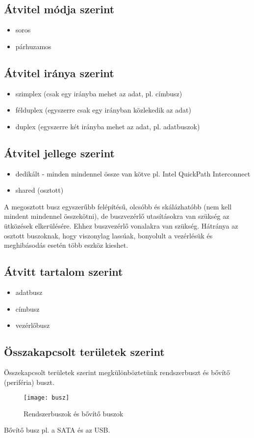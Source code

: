 \subsection{Átvitel módja szerint}
\begin{itemize}
    \item soros
    \item párhuzamos
\end{itemize}

\subsection{Átvitel iránya szerint}
\begin{itemize}
    \item szimplex (csak egy irányba mehet az adat, pl. címbusz)
    \item félduplex (egyszerre csak egy irányban közlekedik az adat)
    \item duplex (egyszerre két irányba mehet az adat, pl. adatbuszok)
\end{itemize}

\subsection{Átvitel jellege szerint}
\begin{itemize}
    \item dedikált - minden mindennel össze van kötve pl. Intel QuickPath Interconnect
    \item shared (osztott)
\end{itemize}
A megosztott busz egyszerűbb felépítésű, olcsóbb és skálázhatóbb (nem kell mindent mindennel összekötni), de buszvezérlő utasításokra van szükség az ütközések elkerülésére.
Ehhez buszvezérlő vonalakra van szükség.
Hátránya az osztott buszoknak, hogy viszonylag lassúak, bonyolult a vezérlésük és meghibásodás esetén több eszköz kieshet.

\subsection{Átvitt tartalom szerint}
\begin{itemize}
    \item adatbusz
    \item címbusz
    \item vezérlőbusz
\end{itemize}

\subsection{Összakapcsolt területek szerint}
Összekapcsolt területek szerint megkülönböztetünk rendszerbuszt és bővítő (periféria) buszt.
\begin{figure}[H]
    \texttt{[image: busz]}
    \centering
    \caption{Rendszerbuszok és bővítő buszok}
    \label{fig:busz}
\end{figure}
Bővítő busz pl. a SATA és az USB.

